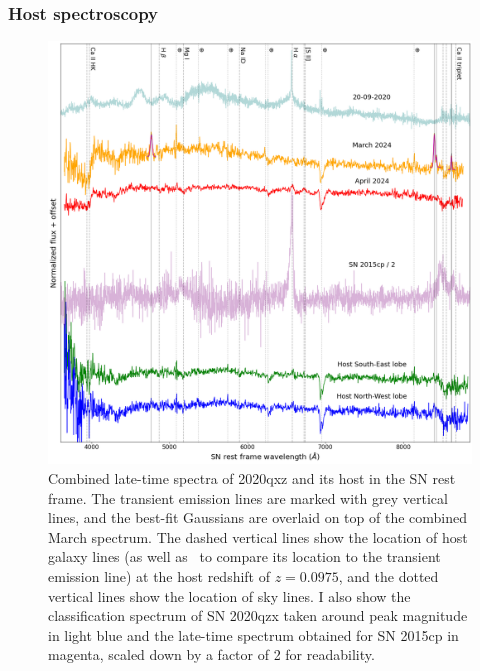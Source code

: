 \documentclass[a4paper,oneside,12pt, class=Latex/Classes/PhDthesisPSnPDF, crop=false]{standalone}
\begin{document}
\subsubsection{Host spectroscopy}
\label{2020qxz_host_specs}
\begin{figure}
    \centering
    \includegraphics[width=\textwidth]{../Images/chapter_5/2020qxz_spec.png}
    \caption{Combined late-time spectra of 2020qxz and its host in the SN rest frame. The transient emission lines are marked with grey vertical lines, and the best-fit Gaussians are overlaid on top of the combined March spectrum. The dashed vertical lines show the location of host galaxy lines (as well as \Hbeta\ to compare its location to the transient emission line) at the host redshift of $z=0.0975$, and the dotted vertical lines show the location of sky lines. I also show the classification spectrum of SN 2020qzx taken around peak magnitude in light blue and the late-time spectrum obtained for SN 2015cp in magenta, scaled down by a factor of 2 for readability.}
    \label{fig:2020qxz_spec}
\end{figure}
\end{document}
